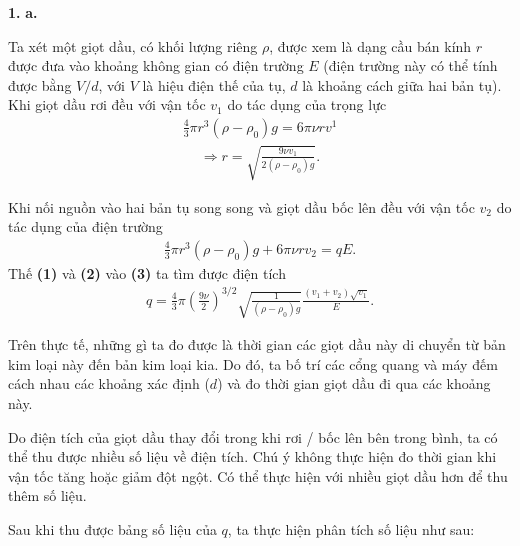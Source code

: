 \textbf{1.}
\textbf{a.}

Ta xét một giọt dầu, có khối lượng riêng $\rho$, được xem là dạng cầu bán kính $r$ được đưa vào khoảng không gian có điện trường $E$ (điện trường này có thể tính được bằng $V/d$, với $V$ là hiệu điện thế của tụ, $d$ là khoảng cách giữa hai bản tụ).\\

Khi giọt dầu rơi đều với vận tốc $v_1$ do tác dụng của trọng lực
\begin{align}
\frac{4}{3}\pi r^3 (\rho - \rho_0)g = 6\pi\nu rv^1
\end{align}
\begin{align}
\Rightarrow r = \sqrt{\frac{9\nu v_1}{2 (\rho-\rho_0)g}}.
\end{align}

Khi nối nguồn vào hai bản tụ song song và giọt dầu bốc lên đều với vận tốc $v_2$ do tác dụng của điện trường
\begin{align}
\frac{4}{3}\pi r^3 (\rho-\rho_0)g + 6\pi\nu rv_2 = qE.
\end{align}
Thế \textbf{(1)} và \textbf{(2)} vào \textbf{(3)} ta tìm được điện tích
\begin{align}
q = \frac{4}{3} \pi \left(\frac{9\nu}{2}\right)^{3/2} \sqrt{\frac{1}{(\rho-\rho_0)g}} \frac {(v_1 + v_2)\sqrt{v_1}}{E}.
\end{align}

Trên thực tế, những gì ta đo được là thời gian các giọt dầu này di chuyển từ bản kim loại này đến bản kim loại kia. Do đó, ta bố trí các cổng quang và máy đếm cách nhau các khoảng xác định ($d$) và đo thời gian giọt dầu đi qua các khoảng này. 

Do điện tích của giọt dầu thay đổi trong khi rơi / bốc lên bên trong bình, ta có thể thu được nhiều số liệu về điện tích. Chú ý không thực hiện đo thời gian khi vận tốc tăng hoặc giảm đột ngột.
Có thể thực hiện với nhiều giọt dầu hơn để thu thêm số liệu.

Sau khi thu được bảng số liệu của $q$, ta thực hiện phân tích số liệu như sau:

